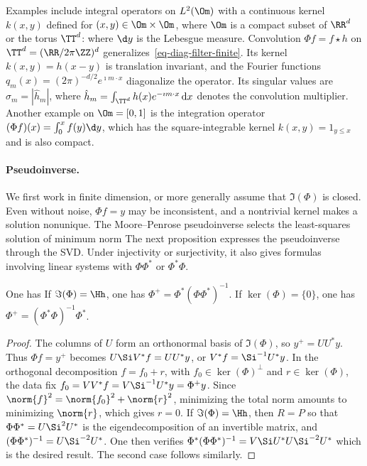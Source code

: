 Examples include integral operators on $L^2(\Om)$ with a continuous kernel $k(x,y)$ defined for $(x,y) \in \Om\times\Om$, where $\Om$ is a compact subset of $\RR^d$ or the torus $\TT^d$:
where $\d y$ is the Lebesgue measure. 
%
Convolution $\Phi f = f \star h$ on $\TT^d=(\RR/2\pi\ZZ)^d$ generalizes~\eqref{eq-diag-filter-finite}. Its kernel $k(x,y) = h(x-y)$ is translation invariant, and the Fourier functions $q_m(x)=(2\pi)^{-d/2}e^{\imath m\cdot x}$ diagonalize the operator. Its singular values are $\sigma_m=|\hat h_m|$, where $\hat h_m=\int_{\TT^d}h(x)e^{-\imath m\cdot x}\,\mathrm{d}x$ denotes the convolution multiplier.
% 
Another example on $\Om=[0,1]$ is the integration operator $(\Phi f)(x) = \int_{0}^x f(y) \d y$, which has the square-integrable kernel $k(x,y)=1_{y\leq x}$ and is also compact.



\paragraph{Pseudoinverse.}

We first work in finite dimension, or more generally assume that $\Im(\Phi)$ is closed. Even without noise, $\Phi f=y$ may be inconsistent, and a nontrivial kernel makes a solution nonunique. The Moore--Penrose pseudoinverse selects the least-squares solution of minimum norm
The next proposition expresses the pseudoinverse through the SVD. Under injectivity or surjectivity, it also gives formulas involving linear systems with $\Phi\Phi^*$ or $\Phi^*\Phi$.

\begin{prop}\label{prop-pseudo-inv}
	One has
	If $\Im(\Phi)=\Hh$, one has $\Phi^+ = \Phi^* (\Phi\Phi^*)^{-1}$.
	If $\ker(\Phi)=\{0\}$, one has $\Phi^+ = (\Phi^* \Phi)^{-1} \Phi^*$.
\end{prop}

\begin{proof}
    The columns of $U$ form an orthonormal basis of $\Im(\Phi)$, so $y^+=UU^* y$. Thus $\Phi f=y^+$ becomes
    $U \Si V^* f = UU^* y$, or $V^* f = \Si^{-1} U^* y$. In the orthogonal decomposition $f=f_0+r$, with $f_0 \in \ker(\Phi)^\bot$ and $r \in \ker(\Phi)$, the data fix $f_0=VV^*f=V\Si^{-1}U^*y=\Phi^+y$. Since $\norm{f}^2=\norm{f_0}^2+\norm{r}^2$, minimizing the total norm amounts to minimizing $\norm{r}$, which gives $r=0$.
	If $\Im(\Phi)=\Hh$, then $R=P$ so that $\Phi\Phi^* = U \Si^2 U^*$ is the eigendecomposition of an invertible matrix, and $(\Phi\Phi^*)^{-1} = U \Si^{-2} U^*$.
	One then verifies $\Phi^* (\Phi\Phi^*)^{-1} = V \Si U^* U \Si^{-2} U^*$ which is the desired result.
	The second case follows similarly.
\end{proof}

